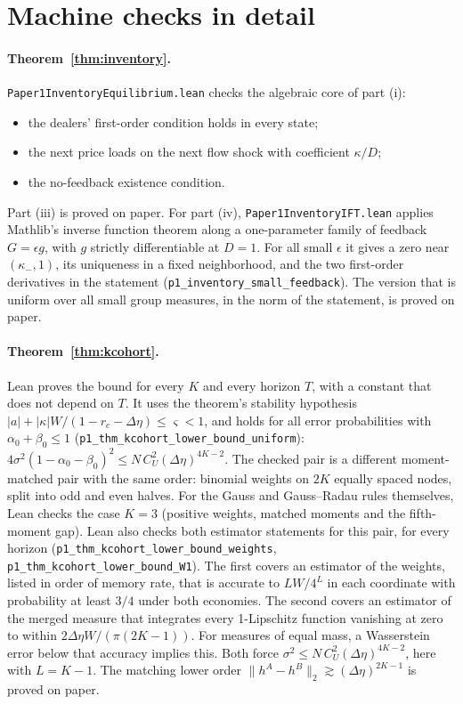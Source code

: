 \documentclass[12pt]{article}
\theoremstyle{definition}
\theoremstyle{remark}
\begin{document}
\section{Machine checks in detail}\label{app:mc}

\paragraph{Theorem~\ref{thm:inventory}.}
\nolinkurl{Paper1InventoryEquilibrium.lean} checks the algebraic core of part (i):
\begin{itemize}[itemsep=1pt,topsep=2pt]
\item the dealers' first-order condition holds in every state;
\item the next price loads on the next flow shock with coefficient $\kappa/D$;
\item the no-feedback existence condition.
\end{itemize}
Part (iii) is proved on paper. For part (iv), \nolinkurl{Paper1InventoryIFT.lean} applies Mathlib's inverse function theorem along a one-parameter family of feedback $G=\epsilon g$, with $g$ strictly differentiable at $D=1$. For all small $\epsilon$ it gives a zero near $(\kappa_-,1)$, its uniqueness in a fixed neighborhood, and the two first-order derivatives in the statement (\nolinkurl{p1_inventory_small_feedback}). The version that is uniform over all small group measures, in the norm of the statement, is proved on paper.
\paragraph{Theorem~\ref{thm:kcohort}.}
Lean proves the bound for every $K$ and every horizon $T$, with a constant that does not depend on $T$. It uses the theorem's stability hypothesis $|a|+|\kappa|W/(1-r_c-\Delta\eta)\le\varsigma<1$, and holds for all error probabilities with $\alpha_0+\beta_0\le1$ (\nolinkurl{p1_thm_kcohort_lower_bound_uniform}): $4\sigma^2(1-\alpha_0-\beta_0)^2\le N\,C_U^2(\Delta\eta)^{4K-2}$. The checked pair is a different moment-matched pair with the same order: binomial weights on $2K$ equally spaced nodes, split into odd and even halves. For the Gauss and Gauss--Radau rules themselves, Lean checks the case $K=3$ (positive weights, matched moments and the fifth-moment gap). Lean also checks both estimator statements for this pair, for every horizon (\nolinkurl{p1_thm_kcohort_lower_bound_weights}, \nolinkurl{p1_thm_kcohort_lower_bound_W1}). The first covers an estimator of the weights, listed in order of memory rate, that is accurate to $LW/4^L$ in each coordinate with probability at least $3/4$ under both economies. The second covers an estimator of the merged measure that integrates every 1-Lipschitz function vanishing at zero to within $2\Delta\eta W/(\pi(2K-1))$. For measures of equal mass, a Wasserstein error below that accuracy implies this. Both force $\sigma^2\le N\,C_U^2(\Delta\eta)^{4K-2}$, here with $L=K-1$. The matching lower order $\|h^A-h^B\|_2\gtrsim(\Delta\eta)^{2K-1}$ is proved on paper.
\end{document}
